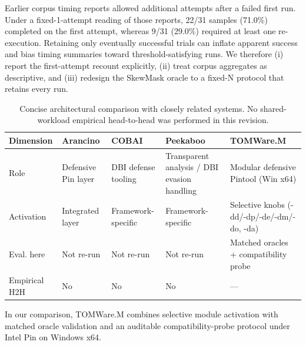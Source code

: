 

Earlier corpus timing reports allowed additional attempts after a failed first run.
Under a fixed-1-attempt reading of those reports, 22/31 samples
(71.0\%) completed on the first attempt, whereas 9/31
(29.0\%) required at least one re-execution. Retaining only eventually
successful trials can inflate apparent success and bias timing summaries toward
threshold-satisfying runs. We therefore (i) report the first-attempt recount
explicitly, (ii) treat corpus aggregates as descriptive, and (iii) redesign the
SkewMask oracle to a fixed-N protocol that retains every run.


\begin{table}[!t]
\centering
\caption{Concise architectural comparison with closely related systems.
No shared-workload empirical head-to-head was performed in this revision.}
\label{tab:related-r3}
\begin{tabular}{p{2.2cm} p{2.6cm} p{2.6cm} p{2.6cm} p{3.2cm}}
\hline
Dimension & Arancino & COBAI & Peekaboo & TOMWare.M \\
\hline
Role & Defensive Pin layer & DBI defense tooling & Transparent analysis / DBI evasion handling & Modular defensive Pintool (Win x64) \\
Activation & Integrated layer & Framework-specific & Framework-specific & Selective knobs (-dd/-dp/-de/-dm/-do, -da) \\
Eval. here & Not re-run & Not re-run & Not re-run & Matched oracles + compatibility probe \\
Empirical H2H & No & No & No & --- \\
\hline
\end{tabular}
\end{table}

In our comparison, TOMWare.M combines selective module activation with matched
oracle validation and an auditable compatibility-probe protocol under Intel Pin
on Windows x64.

